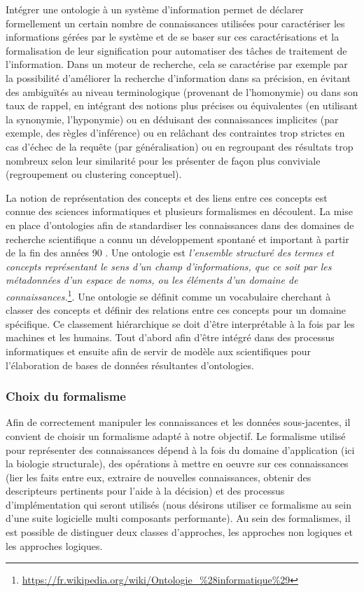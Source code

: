 Intégrer une ontologie à un système d'information permet de déclarer formellement un certain nombre de connaissances utilisées pour caractériser les informations gérées par le système et de se baser sur ces caractérisations et la formalisation de leur signification pour automatiser des tâches de traitement de l'information.
Dans un moteur de recherche, cela se caractérise par exemple par la possibilité d’améliorer la recherche d'information dans sa précision, en évitant des ambiguïtés au niveau terminologique (provenant de l'homonymie) ou dans son taux de rappel, en intégrant des notions plus précises ou équivalentes (en utilisant la synonymie, l'hyponymie) ou en déduisant des connaissances implicites (par exemple, des règles d'inférence) ou en relâchant des contraintes trop strictes en cas d'échec de la requête (par généralisation) ou en regroupant des résultats trop nombreux selon leur similarité pour les présenter de façon plus conviviale (regroupement ou clustering conceptuel).

La notion de représentation des concepts et des liens entre ces concepts est connue des sciences informatiques et plusieurs formalismes en découlent. La mise en place d'ontologies afin de standardiser les connaissances dans des domaines de recherche scientifique a connu un développement spontané et important à partir de la fin des années 90 \cite{schulze-kremer_ontologies_2002, baker_ontology_1999}. 
Une ontologie est \textit{l'ensemble structuré des termes et concepts représentant le sens d'un champ d'informations, que ce soit par les métadonnées d'un espace de noms, ou les éléments d'un domaine de connaissances.}\footnote{\url{https://fr.wikipedia.org/wiki/Ontologie_\%28informatique\%29}}. Une ontologie se définit comme un vocabulaire cherchant à classer des concepts et définir des relations entre ces concepts pour un domaine spécifique. Ce classement hiérarchique se doit d'être interprétable à la fois par les machines et les humains. Tout d'abord afin d'être intégré dans des processus informatiques et ensuite afin de servir de modèle aux scientifiques pour l'élaboration de bases de données résultantes d'ontologies.


\subsubsection{Choix du formalisme}

Afin de correctement manipuler les connaissances et les données sous-jacentes, il convient de choisir un formalisme adapté à notre objectif. Le formalisme utilisé pour représenter des connaissances dépend à la fois du domaine d'application (ici la biologie structurale), des opérations à mettre en oeuvre sur ces connaissances (lier les faits entre eux, extraire de nouvelles connaissances, obtenir des descripteurs pertinents pour l'aide à la décision) et des processus d'implémentation qui seront utilisés (nous désirons utiliser ce formalisme au sein d'une suite logicielle multi composants performante). Au sein des formalismes, il est possible de distinguer deux classes d'approches, les approches non logiques et les approches logiques.

